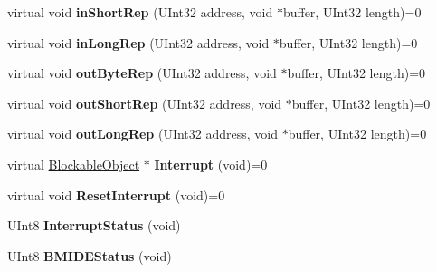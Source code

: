 \begin{DoxyCompactItemize}
\item 
\mbox{\label{class_a_t_a_driver_node_af82e63d322aa2e93ff1c7326eb4946c8}} 
virtual void {\bfseries in\+Short\+Rep} (U\+Int32 address, void $\ast$buffer, U\+Int32 length)=0
\item 
\mbox{\label{class_a_t_a_driver_node_ab0e5bb5348c9f3f512a48fd48821ce7d}} 
virtual void {\bfseries in\+Long\+Rep} (U\+Int32 address, void $\ast$buffer, U\+Int32 length)=0
\item 
\mbox{\label{class_a_t_a_driver_node_ac44712ba1cec68e5af518bbe7ab52ca2}} 
virtual void {\bfseries out\+Byte\+Rep} (U\+Int32 address, void $\ast$buffer, U\+Int32 length)=0
\item 
\mbox{\label{class_a_t_a_driver_node_a40111b18b03dfb80428bcd9f2434e004}} 
virtual void {\bfseries out\+Short\+Rep} (U\+Int32 address, void $\ast$buffer, U\+Int32 length)=0
\item 
\mbox{\label{class_a_t_a_driver_node_a9b078d6ee5c6a3282a4a27e62f56070b}} 
virtual void {\bfseries out\+Long\+Rep} (U\+Int32 address, void $\ast$buffer, U\+Int32 length)=0
\item 
\mbox{\label{class_a_t_a_driver_node_a78e6b31ebb2e275dd2fb9bb49a10588d}} 
virtual \hyperlink{class_blockable_object}{Blockable\+Object} $\ast$ {\bfseries Interrupt} (void)=0
\item 
\mbox{\label{class_a_t_a_driver_node_a5a7a31265883f8371a13d3426fb6add4}} 
virtual void {\bfseries Reset\+Interrupt} (void)=0
\item 
\mbox{\label{class_a_t_a_driver_node_a2a44b1948f7aa7ddfb2d36013b56b8b8}} 
U\+Int8 {\bfseries Interrupt\+Status} (void)
\item 
\mbox{\label{class_a_t_a_driver_node_ac46d045009a24165081e8268b6c472ef}} 
U\+Int8 {\bfseries B\+M\+I\+D\+E\+Status} (void)
\item 
\mbox{\label{class_a_t_a_driver_node_a2867a9c523be6e53f3b2b2828db351ff}} 

\end{DoxyCompactItemize}
